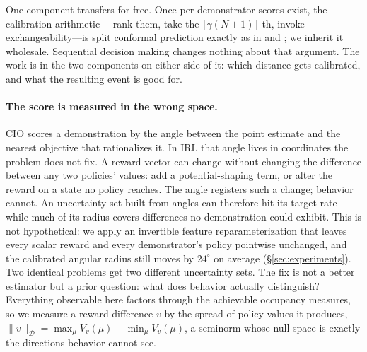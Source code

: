 \documentclass{article}
\newcommand{\Dnorm}[1]{\|#1\|_{\mathcal D}}
\begin{document}
One component transfers for free. Once per-demonstrator scores exist, the
calibration arithmetic---%
rank them, take the $\lceil\gamma(N+1)\rceil$-th, invoke exchangeability---is
split conformal prediction exactly as in \citet{vovk2005algorithmic} and
\citet{lin2024conformal}; we inherit it wholesale. Sequential decision making
changes nothing about that argument. The work is in the two components on either
side of it: which distance gets calibrated, and what the resulting event is
good for.

\paragraph{The score is measured in the wrong space.} CIO scores a
demonstration by the angle between the point estimate and the nearest objective
that rationalizes it. In IRL that angle lives in coordinates the problem does
not fix. A reward vector can change without changing the difference between any
two policies' values: add a potential-shaping term, or alter the reward on a
state no policy reaches. The angle registers such a change; behavior cannot. An
uncertainty set built from angles can therefore hit its target rate while
much of its radius covers differences no demonstration could exhibit. This is
not hypothetical:
we apply an invertible feature reparameterization that leaves every scalar
reward and every demonstrator's policy pointwise unchanged, and the calibrated
angular radius still moves by $24^\circ$ on average (\S\ref{sec:experiments}).
Two identical problems get two different uncertainty sets. The fix is not a
better estimator but a prior question: what does behavior actually distinguish?
Everything observable here factors through the achievable occupancy measures,
so we measure a reward difference $v$ by the spread of policy values it
produces, $\Dnorm{v}=\max_\mu
V_v(\mu)-\min_\mu V_v(\mu)$, a seminorm whose null space is exactly the
directions behavior cannot see.
\end{document}
